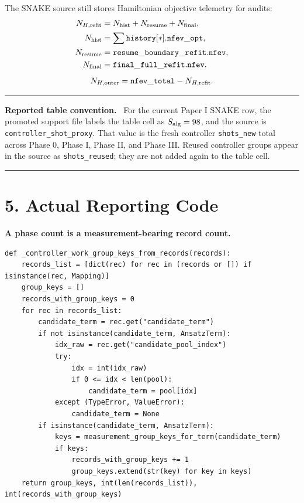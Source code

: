 \documentclass[10pt,twocolumn]{article}
\newcommand{\Salg}{S_{\rm alg}}
\newcommand{\NHouter}{N_{H,\rm outer}}
\newcommand{\NHrefit}{N_{H,\rm refit}}
\newcommand{\boxline}{\vspace{2pt}\hrule\vspace{3pt}}
\newenvironment{primerbox}[1]{%
  \boxline\begingroup\raggedright\textbf{#1.}\ }{\par\endgroup\boxline}
\begin{document}
The SNAKE source still stores Hamiltonian objective telemetry for audits:
\[
  \begin{aligned}
  \NHrefit
  &=
  N_{\rm hist}+N_{\rm resume}+N_{\rm final},\\
  N_{\rm hist}
  &=\sum {\tt history[*].nfev\_opt},\\
  N_{\rm resume}
  &={\tt resume\_boundary\_refit.nfev},\\
  N_{\rm final}
  &={\tt final\_full\_refit.nfev}.
  \end{aligned}
\]
\[
  \NHouter={\tt nfev\_total}-\NHrefit.
\]

\begin{primerbox}{Reported table convention}
For the current Paper I SNAKE row, the promoted support file labels the table
cell as \(\Salg=98\), and the source is \texttt{controller\_shot\_proxy}.
That value is the fresh controller \texttt{shots\_new} total across Phase 0,
Phase I, Phase II, and Phase III.  Reused controller groups appear in the
source as \texttt{shots\_reused}; they are not added again to the table cell.
\end{primerbox}

\section*{5. Actual Reporting Code}

\textbf{\footnotesize A phase count is a measurement-bearing record count.}

\footnotesize{}
\begin{lstlisting}
def _controller_work_group_keys_from_records(records):
    records_list = [dict(rec) for rec in (records or []) if isinstance(rec, Mapping)]
    group_keys = []
    records_with_group_keys = 0
    for rec in records_list:
        candidate_term = rec.get("candidate_term")
        if not isinstance(candidate_term, AnsatzTerm):
            idx_raw = rec.get("candidate_pool_index")
            try:
                idx = int(idx_raw)
                if 0 <= idx < len(pool):
                    candidate_term = pool[idx]
            except (TypeError, ValueError):
                candidate_term = None
        if isinstance(candidate_term, AnsatzTerm):
            keys = measurement_group_keys_for_term(candidate_term)
            if keys:
                records_with_group_keys += 1
                group_keys.extend(str(key) for key in keys)
    return group_keys, int(len(records_list)), int(records_with_group_keys)
\end{lstlisting}
\end{document}
